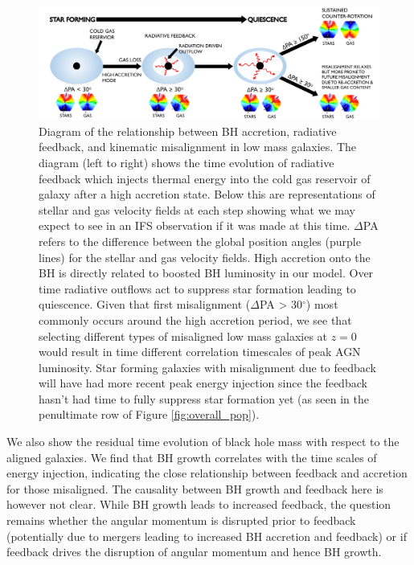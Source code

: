 \documentclass[fleqn,usenatbib]{mnras}
\begin{document}
\begin{figure}
	\includegraphics[width=\linewidth]{quasar_mode_feedback.pdf}
    \caption{Diagram of the relationship between BH accretion, radiative feedback, and kinematic misalignment in low mass galaxies. The diagram (left to right) shows the time evolution of radiative feedback which injects thermal energy into the cold gas reservoir of galaxy after a high accretion state. Below this are representations of stellar and gas velocity fields at each step showing what we may expect to see in an IFS observation if it was made at this time. $\Delta$PA refers to the difference between the global position angles (purple lines) for the stellar and gas velocity fields. High accretion onto the BH is directly related to boosted BH luminosity in our model. Over time radiative outflows act to suppress star formation leading to quiescence. Given that first misalignment ($\Delta$PA > 30$^{\circ}$) most commonly occurs around the high accretion period, we see that selecting different types of misaligned low mass galaxies at $z=0$ would result in time different correlation timescales of peak AGN luminosity. Star forming galaxies with misalignment due to feedback will have had more recent peak energy injection since the feedback hasn't had time to fully suppress star formation yet (as seen in the penultimate row of Figure \ref{fig:overall_pop}).}
    \label{fig:diagram}
\end{figure}

We also show the residual time evolution of black hole mass with respect to the aligned galaxies. We find that BH growth correlates with the time scales of energy injection, indicating the close relationship between feedback and accretion for those misaligned. The causality between BH growth and feedback here is however not clear. While BH growth leads to increased feedback, the question remains whether the angular momentum is disrupted prior to feedback (potentially due to mergers leading to increased BH accretion and feedback) or if feedback drives the disruption of angular momentum and hence BH growth.
\end{document}
